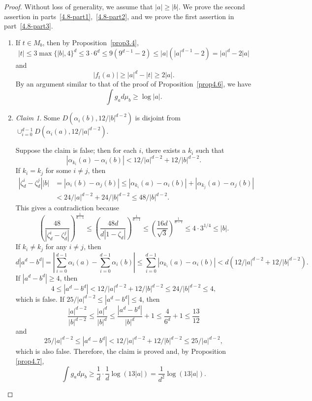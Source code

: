 \documentclass[10pt,a4paper]{amsart}
\numberwithin{equation}{section}
\theoremstyle{plain}
\theoremstyle{definition}
\theoremstyle{remark}
\newtheorem*{claim*}{Claim}
\begin{document}
\begin{proof}
Without loss of generality, we assume that $|a|\geq|b|$. We prove
the second assertion in parts~\eqref{4.8-part1},~\eqref{4.8-part2}, and we prove the first assertion
in part~\eqref{4.8-part3}.

\begin{enumerate}[wide]
\item\label{4.8-part1}
   If $t\in M_{b}$, then by
Proposition~\ref{prop3.4},
\[
|t|\leq3\max\{|b|,4\}^{d}\leq3\cdot6^{d}\leq9\left(9^{d-1}-2\right)\leq|a|\left(|a|^{d-1}-2\right)=|a|^{d}-2|a|
\]
and
\[
|f_{t}(a)|\geq|a|^{d}-|t|\geq2|a|.
\]
By an argument similar to that of the proof of Proposition~\ref{prop4.6},
we have
\[
\int g_{a}d\mu_{b}\geq\log|a|.
\]

\item\label{4.8-part2}

\begin{claim*} Some $D(\alpha_{i}(b),12/|b|^{d-2})$ is disjoint
from $\cup_{i=0}^{d-1}D(\alpha_{i}(a),12/|a|^{d-2})$.
\end{claim*}

Suppose the claim is false; then for each $i$, there exists a $k_{i}$ such that
\[
|\alpha_{k_{i}}(a)-\alpha_{i}(b)|<12/|a|^{d-2}+12/|b|^{d-2}.
\]
If $k_{i}=k_{j}$ for some $i\neq j$, then
\begin{align*}
\left|\zeta_{d}^{i}-\zeta_{d}^{j}\right||b| & =|\alpha_{i}(b)-\alpha_{j}(b)|\leq|\alpha_{k_{i}}(a)-\alpha_{i}(b)|+|\alpha_{k_{j}}(a)-\alpha_{j}(b)|\\
 & <24/|a|^{d-2}+24/|b|^{d-2}\leq48/|b|^{d-2}.
\end{align*}
This gives a contradiction because
\[
\left(\frac{48}{\left|\zeta_{d}^{i}-\zeta_{d}^{j}\right|}\right)^{\frac{1}{d-1}}\leq\left(\frac{48d}{d\left|1-\zeta_{d}\right|}\right)^{\frac{1}{d-1}}\leq\left(\frac{16d}{\sqrt{3}}\right)^{\frac{1}{d-1}}\leq4\cdot3^{1/4}\leq|b|.
\]
If $k_{i}\neq k_{j}$ for any $i\neq j$, then
\[
d|a^{d}-b^{d}|=\left|\sum_{i=0}^{d-1}\alpha_{i}(a)-\sum_{i=0}^{d-1}\alpha_{i}(b)\right|\leq\sum_{i=0}^{d-1}\left|\alpha_{k_{i}}(a)-\alpha_{i}(b)\right|<d\left(12/|a|^{d-2}+12/|b|^{d-2}\right).
\]
If $|a^{d}-b^{d}|\geq4$, then
\[
4\leq\left|a^{d}-b^{d}\right|<12/|a|^{d-2}+12/|b|^{d-2}\leq24/|b|^{d-2}\leq4,
\]
which is false. If $25/|a|^{d-2}\leq|a^{d}-b^{d}|\leq4$, then
\[
\frac{|a|^{d-2}}{|b|^{d-2}}\leq\frac{|a|^{d}}{|b|^{d}}\leq\frac{|a^{d}-b^{d}|}{|b|^{d}}+1\leq\frac{4}{6^{d}}+1\leq\frac{13}{12}
\]
and
\[
25/|a|^{d-2}\leq|a^{d}-b^{d}|<12/|a|^{d-2}+12/|b|^{d-2}\leq25/|a|^{d-2},
\]
which is also false. Therefore, the claim is proved and, by Proposition
\ref{prop4.7},
\[
\int g_{a}d\mu_{b}\geq\frac{1}{d}\cdot\frac{1}{d}\log(13|a|)=\frac{1}{d^{2}}\log(13|a|).
\]


\end{enumerate}
\end{proof}
\end{document}
